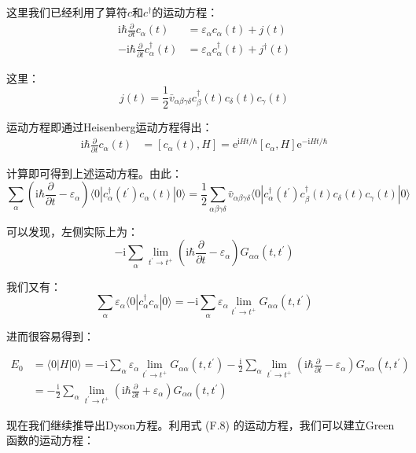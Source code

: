 \begin{enumerate}
这里我们已经利用了算符$c$和$c^{\dagger}$的运动方程：
\begin{align}
\mathrm{i}\hbar\frac{\partial}{\partial t}c_{\alpha}(t) & =\varepsilon_{\alpha}c_{\alpha}(t)+j(t)\label{eq:EOM of a}\\
-\mathrm{i}\hbar\frac{\partial}{\partial t}c^{\dagger}_{\alpha}(t) & =\varepsilon_{\alpha}c^{\dagger}_{\alpha}(t)+j^{\dagger}(t)\nonumber 
\end{align}

这里：
\[
j(t)=\frac{1}{2}\bar{v}_{\alpha\beta\gamma\delta}c^{\dagger}_{\beta}(t)c_{\delta}(t)c_{\gamma}(t)
\]

\begin{booknote*}
运动方程即通过Heisenberg运动方程得出：
\begin{align*}
\mathrm{i}\hbar\frac{\partial}{\partial t}c_{\alpha}(t) & =[c_{\alpha}(t),H]=\mathrm{e}^{\mathrm{i}Ht/\hbar}[c_{\alpha},H]\mathrm{e}^{-\mathrm{i}Ht/\hbar}
\end{align*}

计算即可得到上述运动方程。由此：
\[
\sum_{\alpha}\left(\mathrm{i}\hbar\frac{\partial}{\partial t}-\varepsilon_{\alpha}\right)\langle0|c^{\dagger}_{\alpha}(t^{\prime})c_{\alpha}(t)|0\rangle=\frac{1}{2}\sum_{\alpha\beta\gamma\delta}\bar{v}_{\alpha\beta\gamma\delta}\langle0|c^{\dagger}_{\alpha}(t^{\prime})c^{\dagger}_{\beta}(t)c_{\delta}(t)c_{\gamma}(t)|0\rangle
\]

可以发现，左侧实际上为：
\[
-\mathrm{i}\sum_{\alpha}\lim_{t^{\prime}\rightarrow t^{+}}\left(\mathrm{i}\hbar\frac{\partial}{\partial t}-\varepsilon_{\alpha}\right)G_{\alpha\alpha}(t,t^{\prime})
\]

我们又有：
\[
\sum_{\alpha}\varepsilon_{\alpha}\langle0|c^{\dagger}_{\alpha}c_{\alpha}|0\rangle=-\mathrm{i}\sum_{\alpha}\varepsilon_{\alpha}\lim_{t^{\prime}\rightarrow t^{+}}G_{\alpha\alpha}(t,t^{\prime})
\]

进而很容易得到：

\begin{align*}
E_{0} & =\langle0|H|0\rangle=-\mathrm{i}\sum_{\alpha}\varepsilon_{\alpha}\lim_{t^{\prime}\rightarrow t^{+}}G_{\alpha\alpha}(t,t^{\prime})-\frac{\mathrm{i}}{2}\sum_{\alpha}\lim_{t^{\prime}\rightarrow t^{+}}\left(\mathrm{i}\hbar\frac{\partial}{\partial t}-\varepsilon_{\alpha}\right)G_{\alpha\alpha}(t,t^{\prime})\\
 & =-\frac{\mathrm{i}}{2}\sum_{\alpha}\lim_{t^{\prime}\rightarrow t^{+}}\left(\mathrm{i}\hbar\frac{\partial}{\partial t}+\varepsilon_{\alpha}\right)G_{\alpha\alpha}(t,t^{\prime})
\end{align*}
\end{booknote*}
\end{enumerate}
现在我们继续推导出Dyson方程。利用式 (F.8) 的运动方程，我们可以建立Green函数的运动方程：

